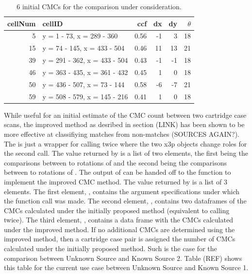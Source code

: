 \begin{table}[htbp]
    \centering
    \begin{tabular}{|r|l|r|r|r|r|}
\hline
cellNum & cellID & ccf & dx & dy & $\theta$\\
\hline
5 & y = 1 - 73, x = 289 - 360 & 0.56 & -1 & 3 & 18\\
\hline
15 & y = 74 - 145, x = 433 - 504 & 0.46 & 11 & 13 & 21\\
\hline
39 & y = 291 - 362, x = 433 - 504 & 0.43 & -1 & -1 & 18\\
\hline
46 & y = 363 - 435, x = 361 - 432 & 0.45 & 1 & 0 & 18\\
\hline
50 & y = 436 - 507, x = 73 - 144 & 0.58 & -6 & -7 & 21\\
\hline
59 & y = 508 - 579, x = 145 - 216 & 0.41 & 1 & 0 & 18\\
\hline
\end{tabular}
    \caption{6 initial CMCs for the comparison under consideration.}
    \label{tab:km1_unknown2_initialCMC}
\end{table}

While useful for an initial estimate of the CMC count between two cartridge case scans, the improved method as desribed in section (LINK) has been shown to be more effective at classifiying matches from non-matches (SOURCES AGAIN?). The  is just a wrapper for calling  twice where the two x3p objects change roles for the second call. The value returned by  is a list of two elements, the first being the comparisons between  to rotations of  and the second being the comparisons between  to rotations of . The output of  can be handed off to the  function to implement the improved CMC method. The value returned by  is a list of 3 elements. The first element, , contains the argument specifications under which the function call was made. The second element, , contains two dataframes of the CMCs calculated under the initially proposed method (equivalent to calling  twice). The third element, , contains a data frame with the CMCs calculated under the improved method. If no additional CMCs are determined using the improved method, then a cartridge case pair is assigned the number of CMCs calculated under the initially proposed method. Such is the case for the comparison between Unknown Source and Known Source 2. Table (REF) shows this table for the current use case between Unknown Source and Known Source 1. 

